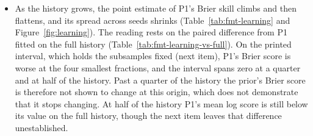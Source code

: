 \begin{itemize}
\item As the history grows, the point estimate of P1's Brier skill climbs and then flattens, and its spread across seeds shrinks (Table~\ref{tab:fmt-learning} and Figure~\ref{fig:learning}). The reading rests on the paired difference from P1 fitted on the full history (Table~\ref{tab:fmt-learning-vs-full}). On the printed interval, which holds the subsamples fixed (next item), P1's Brier score is worse at the four smallest fractions, and the interval spans zero at a quarter and at half of the history. Past a quarter of the history the prior's Brier score is therefore not shown to change at this origin, which does not demonstrate that it stops changing. At half of the history P1's mean log score is still below its value on the full history, though the next item leaves that difference unestablished.

\end{itemize}
